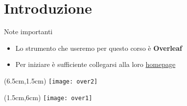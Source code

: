 \section{Introduzione}
  \begin{frame}{Note importanti}

    \begin{itemize}
      \item Lo strumento che useremo per questo corso è \textbf{Overleaf}
      \item Per iniziare è sufficiente collegarsi alla loro \textcolor{blue}{\href{https://it.overleaf.com/}{homepage}}
    \end{itemize}
    
    \begin{textblock*}{5cm}(6.5cm,1.5cm)
      \texttt{[image: over2]}
    \end{textblock*}

    \begin{textblock*}{5cm}(1.5cm,6cm)
      \texttt{[image: over1]}
    \end{textblock*}

  \end{frame}
